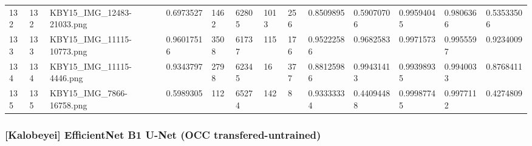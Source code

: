 \documentclass[11pt, a4paper, twoside]{report}
\begin{document}
\begin{longtable}[c]{@{}lllllllllllll@{}}
132 & 132 & KBY15\_IMG\_12483-21033.png & 0.6973527 & 1462 & 62805 & 1013 & 256 & 0.8509895 & 0.59070706 & 0.99594045 & 0.9806366 & 0.53533506 \\
133 & 133 & KBY15\_IMG\_11115-10773.png & 0.96017516 & 3508 & 61737 & 115 & 176 & 0.95222586 & 0.9682583 & 0.9971573 & 0.9955597 & 0.9234009 \\
134 & 134 & KBY15\_IMG\_11115-4446.png & 0.9343797 & 2798 & 62345 & 16 & 377 & 0.88125986 & 0.99431413 & 0.99398935 & 0.9940033 & 0.8768411 \\
135 & 135 & KBY15\_IMG\_7866-16758.png & 0.5989305 & 112 & 65274 & 142 & 8 & 0.93333334 & 0.44094488 & 0.99987745 & 0.9977112 & 0.4274809 \\* \bottomrule
\end{longtable}

\newpag

\subsubsection{[Kalobeyei] EfficientNet B1 U-Net (OCC transfered-untrained)}
\end{document}
